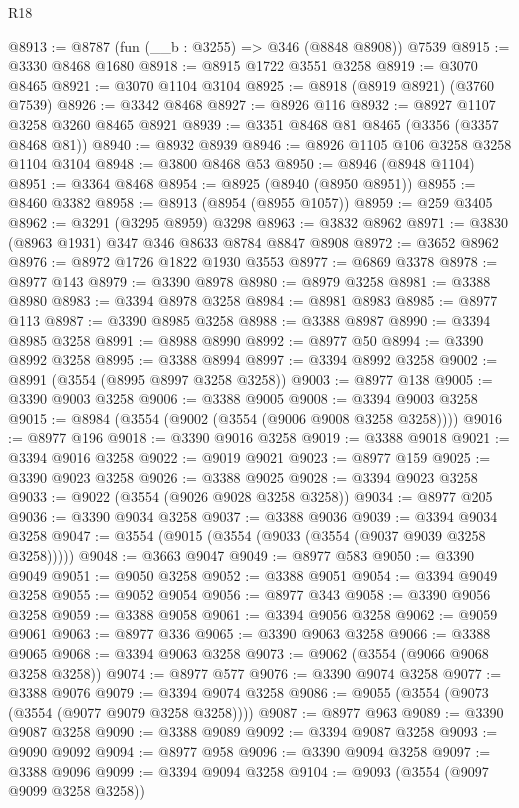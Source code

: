 \begin{lexlean}{R18}
\begin{coremodule}
@8913 := @8787 (fun (__b : @3255) => @346 (@8848 @8908)) @7539
@8915 := @3330 @8468 @1680
@8918 := @8915 @1722 @3551 @3258
@8919 := @3070 @8465
@8921 := @3070 @1104 @3104
@8925 := @8918 (@8919 @8921) (@3760 @7539)
@8926 := @3342 @8468
@8927 := @8926 @116
@8932 := @8927 @1107 @3258 @3260 @8465 @8921
@8939 := @3351 @8468 @81 @8465 (@3356 (@3357 @8468 @81))
@8940 := @8932 @8939
@8946 := @8926 @1105 @106 @3258 @3258 @1104 @3104
@8948 := @3800 @8468 @53
@8950 := @8946 (@8948 @1104)
@8951 := @3364 @8468
@8954 := @8925 (@8940 (@8950 @8951))
@8955 := @8460 @3382
@8958 := @8913 (@8954 (@8955 @1057))
@8959 := @259 @3405
@8962 := @3291 (@3295 @8959) @3298
@8963 := @3832 @8962
@8971 := @3830 (@8963 @1931) @347 @346 @8633 @8784 @8847 @8908
@8972 := @3652 @8962
@8976 := @8972 @1726 @1822 @1930 @3553
@8977 := @6869 @3378
@8978 := @8977 @143
@8979 := @3390 @8978
@8980 := @8979 @3258
@8981 := @3388 @8980
@8983 := @3394 @8978 @3258
@8984 := @8981 @8983
@8985 := @8977 @113
@8987 := @3390 @8985 @3258
@8988 := @3388 @8987
@8990 := @3394 @8985 @3258
@8991 := @8988 @8990
@8992 := @8977 @50
@8994 := @3390 @8992 @3258
@8995 := @3388 @8994
@8997 := @3394 @8992 @3258
@9002 := @8991 (@3554 (@8995 @8997 @3258 @3258))
@9003 := @8977 @138
@9005 := @3390 @9003 @3258
@9006 := @3388 @9005
@9008 := @3394 @9003 @3258
@9015 := @8984 (@3554 (@9002 (@3554 (@9006 @9008 @3258 @3258))))
@9016 := @8977 @196
@9018 := @3390 @9016 @3258
@9019 := @3388 @9018
@9021 := @3394 @9016 @3258
@9022 := @9019 @9021
@9023 := @8977 @159
@9025 := @3390 @9023 @3258
@9026 := @3388 @9025
@9028 := @3394 @9023 @3258
@9033 := @9022 (@3554 (@9026 @9028 @3258 @3258))
@9034 := @8977 @205
@9036 := @3390 @9034 @3258
@9037 := @3388 @9036
@9039 := @3394 @9034 @3258
@9047 := @3554 (@9015 (@3554 (@9033 (@3554 (@9037 @9039 @3258 @3258)))))
@9048 := @3663 @9047
@9049 := @8977 @583
@9050 := @3390 @9049
@9051 := @9050 @3258
@9052 := @3388 @9051
@9054 := @3394 @9049 @3258
@9055 := @9052 @9054
@9056 := @8977 @343
@9058 := @3390 @9056 @3258
@9059 := @3388 @9058
@9061 := @3394 @9056 @3258
@9062 := @9059 @9061
@9063 := @8977 @336
@9065 := @3390 @9063 @3258
@9066 := @3388 @9065
@9068 := @3394 @9063 @3258
@9073 := @9062 (@3554 (@9066 @9068 @3258 @3258))
@9074 := @8977 @577
@9076 := @3390 @9074 @3258
@9077 := @3388 @9076
@9079 := @3394 @9074 @3258
@9086 := @9055 (@3554 (@9073 (@3554 (@9077 @9079 @3258 @3258))))
@9087 := @8977 @963
@9089 := @3390 @9087 @3258
@9090 := @3388 @9089
@9092 := @3394 @9087 @3258
@9093 := @9090 @9092
@9094 := @8977 @958
@9096 := @3390 @9094 @3258
@9097 := @3388 @9096
@9099 := @3394 @9094 @3258
@9104 := @9093 (@3554 (@9097 @9099 @3258 @3258))

\end{coremodule}
\end{lexlean}
